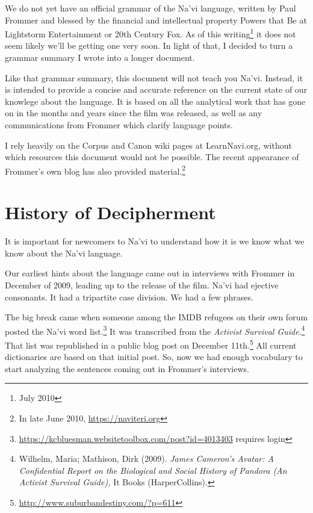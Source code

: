 
We do not yet have an official grammar of the Na'vi language, written
by Paul Frommer and blessed by the financial and intellectual property
Powers that Be at Lightstorm Entertainment or 20th Century Fox.  As of
this writing\footnote{July 2010} it does not seem likely we'll be
getting one very soon. In light of that, I decided to turn a grammar
summary I wrote into a longer document.

Like that grammar summary, this document will not teach you Na'vi.
Instead, it is intended to provide a concise and accurate reference on
the current state of our knowlege about the language.  It is based on
all the analytical work that has gone on in the months and years since
the film was released, as well as any communications from Frommer
which clarify language points.

I rely heavily on the Corpus and Canon wiki pages at LearnNavi.org,
without which resources this document would not be possible.  The
recent appearance of Frommer's own blog has also provided
material.\footnote{In late June 2010, \url{https://naviteri.org}}


\section{History of Decipherment}
It is important for newcomers to Na'vi to understand how it is we know
what we know about the Na'vi language.

Our earliest hints about the language came out in interviews with
Frommer in December of 2009, leading up to the release of the film.
Na'vi had ejective consonants.  It had a tripartite case division.  We
had a few phrases.

The big break came when someone among the IMDB refugees on their own
forum posted the Na'vi word
list.\footnote{\url{https://kcbluesman.websitetoolbox.com/post?id=4013403}
requires login}  It was transcribed from the \textit{Activist
Survival Guide}.\footnote{Wilhelm, Maria; Mathison, Dirk (2009). \textit{James
Cameron's Avatar: A Confidential Report on the Biological and Social
History of Pandora (An Activist Survival Guide),} It Books (HarperCollins).}
That list was republished in a public blog post on December
11th.\footnote{\url{http://www.suburbandestiny.com/?p=611}} All
current dictionaries are based on that initial post.  So, now we had
enough vocabulary to start analyzing the sentences coming out in
Frommer's interviews.

